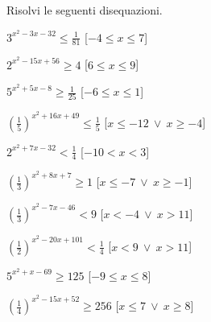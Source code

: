 \begin{esercizio}\label{ese:}
 Risolvi le seguenti disequazioni.
\begin{multicols}{2}
 \begin{enumeratea}
  \item  \(3^{x^2 -3 x -32} \leqslant \frac{1}{81}\)
   \hfill [\(-4 \leqslant x \leqslant 7\)]
  \item  \(2^{x^2 -15 x +56} \geqslant 4\)
   \hfill [\(6 \leqslant x \leqslant 9\)]
  \item  \(5^{x^2 +5 x -8} \geqslant \frac{1}{25}\)
   \hfill [\(-6 \leqslant x \leqslant 1\)]
  \item  \(\left(\frac{1}{5}\right)^{x^2 +16 x +49} \leqslant \frac{1}{5}\)
   \hfill [\(x \leqslant -12~\vee~x \geqslant -4\)]
  \item  \(2^{x^2 +7 x -32} < \frac{1}{4}\)
   \hfill [\(-10 < x < 3\)]
  \item  \(\left(\frac{1}{3}\right)^{x^2 +8 x +7} \geqslant 1\)
   \hfill [\(x \leqslant -7~\vee~x \geqslant -1\)]
  \item  \(\left(\frac{1}{3}\right)^{x^2 -7 x -46} < 9\)
   \hfill [\(x < -4~\vee~x > 11\)]
  \item  \(\left(\frac{1}{2}\right)^{x^2 -20 x +101} < \frac{1}{4}\)
   \hfill [\(x < 9~\vee~x > 11\)]
  \item  \(5^{x^2 + x -69} \geqslant 125\)
   \hfill [\(-9 \leqslant x \leqslant 8\)]
  \item  \(\left(\frac{1}{4}\right)^{x^2 -15 x +52} \geqslant 256\)
   \hfill [\(x \leqslant 7~\vee~x \geqslant 8\)]

\end{enumeratea}
\end{multicols}
\end{esercizio}
